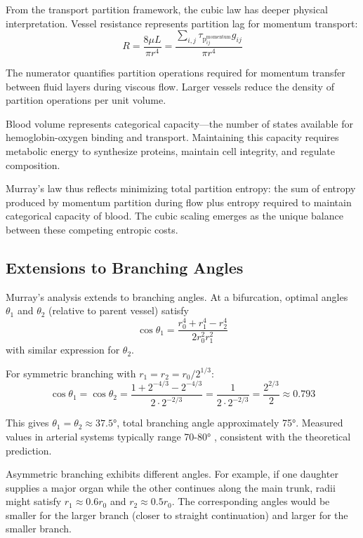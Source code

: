 \documentclass[10pt,twocolumn,a4paper]{article}
\theoremstyle{remark}
\newcommand{\taulag}{\tau_{\mathrm{p}}}
\begin{document}
From the transport partition framework, the cubic law has deeper physical interpretation. Vessel resistance represents partition lag for momentum transport:
\begin{equation}
R = \frac{8\mu L}{\pi r^{4}} = \frac{\sum_{i,j} \taulag_{ij}^{\mathrm{momentum}} g_{ij}}{\pi r^{4}}
\end{equation}

The numerator quantifies partition operations required for momentum transfer between fluid layers during viscous flow. Larger vessels reduce the density of partition operations per unit volume.

Blood volume represents categorical capacity—the number of states available for hemoglobin-oxygen binding and transport. Maintaining this capacity requires metabolic energy to synthesize proteins, maintain cell integrity, and regulate composition.

Murray's law thus reflects minimizing total partition entropy: the sum of entropy produced by momentum partition during flow plus entropy required to maintain categorical capacity of blood. The cubic scaling emerges as the unique balance between these competing entropic costs.

\subsection{Extensions to Branching Angles}

Murray's analysis extends to branching angles. At a bifurcation, optimal angles $\theta_{1}$ and $\theta_{2}$ (relative to parent vessel) satisfy
\begin{equation}
\cos \theta_{1} = \frac{r_{0}^{4} + r_{1}^{4} - r_{2}^{4}}{2r_{0}^{2}r_{1}^{2}}
\end{equation}
with similar expression for $\theta_{2}$.

For symmetric branching with $r_{1} = r_{2} = r_{0}/2^{1/3}$:
\begin{equation}
\cos \theta_{1} = \cos \theta_{2} = \frac{1 + 2^{-4/3} - 2^{-4/3}}{2 \cdot 2^{-2/3}} = \frac{1}{2 \cdot 2^{-2/3}} = \frac{2^{2/3}}{2} \approx 0.793
\end{equation}

This gives $\theta_{1} = \theta_{2} \approx 37.5°$, total branching angle approximately 75°. Measured values in arterial systems typically range 70-80° \cite{zamir1976optimality}, consistent with the theoretical prediction.

Asymmetric branching exhibits different angles. For example, if one daughter supplies a major organ while the other continues along the main trunk, radii might satisfy $r_{1} \approx 0.6r_{0}$ and $r_{2} \approx 0.5r_{0}$. The corresponding angles would be smaller for the larger branch (closer to straight continuation) and larger for the smaller branch.
\end{document}
